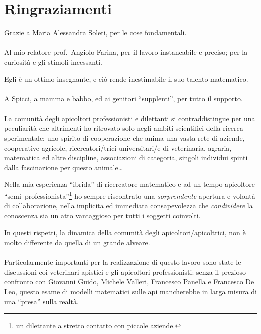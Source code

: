 \cleardoublepage
{} %
\section*{Ringraziamenti}
Grazie a Maria Alessandra Soleti, per le cose fondamentali.

\paragraph{}
Al mio relatore prof.~Angiolo Farina, per il lavoro instancabile e preciso; per la curiosità e gli stimoli incessanti.

Egli è un ottimo insegnante, e ciò rende inestimabile il suo talento matematico.

\paragraph{}
A Spicci, a mamma e babbo, ed ai genitori ``supplenti'', per tutto il supporto.

\paragraph{}
La comunità degli apicoltori professionisti e dilettanti si contraddistingue per una peculiarità
che altrimenti ho ritrovato solo negli ambiti scientifici della ricerca sperimentale: uno spirito di cooperazione
che anima una vasta rete di aziende, cooperative agricole, ricercatori/trici universitari/e di veterinaria, agraria,
matematica ed altre discipline, associazioni di categoria, singoli individui spinti dalla fascinazione per
questo animale\dots

Nella mia esperienza ``ibrida'' di ricercatore matematico e ad un tempo
apicoltore ``semi--professionista''\footnote{\ie un dilettante a stretto contatto con piccole aziende.}
ho sempre riscontrato una \emph{sorprendente} apertura e volontà di collaborazione, nella implicita ed immediata
consapevolezza che \emph{condividere} la conoscenza sia un atto vantaggioso per tutti i soggetti coinvolti.

In questi rispetti, la dinamica della comunità degli apicoltori/apicoltrici, non è molto differente da
quella di un grande alveare.

\paragraph{}
Particolarmente importanti per la realizzazione di questo lavoro sono state le discussioni coi veterinari apistici
e gli apicoltori professionisti: senza il prezioso confronto con Giovanni Guido, Michele Valleri, Francesco Panella
e Francesco De Leo, questo esame di modelli matematici sulle api mancherebbe in larga misura di una ``presa'' sulla realtà.




